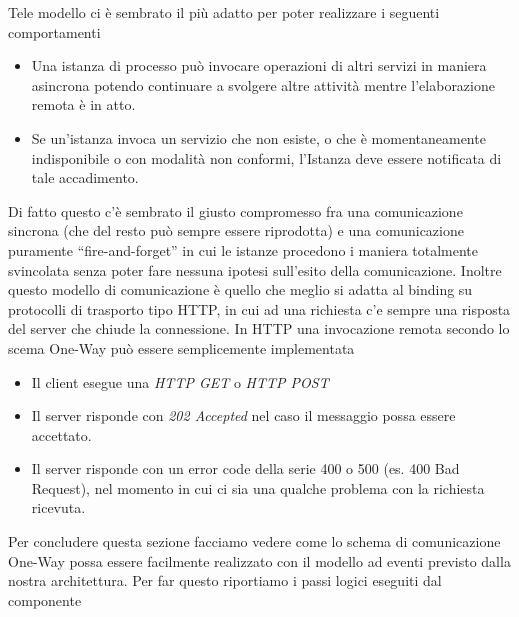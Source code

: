 Tele modello ci \`e sembrato il più adatto per poter realizzare i seguenti
comportamenti

\begin{itemize}
  \item Una istanza di processo può invocare operazioni di altri servizi in
  maniera asincrona potendo continuare a svolgere altre attività mentre
  l'elaborazione remota \`e in atto.
  
  \item Se un'istanza invoca un servizio che non esiste, o che \`e
  momentaneamente indisponibile o con modalità non conformi, l'Istanza deve essere notificata
  di tale accadimento.
\end{itemize}

Di fatto questo c'\`e sembrato il giusto compromesso fra una comunicazione
sincrona (che del resto può sempre essere riprodotta) e una comunicazione puramente
``fire-and-forget'' in cui le istanze procedono i maniera totalmente svincolata
senza poter fare nessuna ipotesi sull'esito della comunicazione. Inoltre questo
modello di comunicazione \`e quello che meglio si adatta al binding su
protocolli di trasporto tipo HTTP, in cui ad una richiesta c'e sempre una
risposta del server che chiude la connessione. In HTTP una invocazione remota secondo lo scema
One-Way può essere semplicemente implementata

\begin{itemize}
  \item Il client esegue una \emph{HTTP GET} o \emph{HTTP POST}
  \item Il server risponde con \emph{202 Accepted} nel caso il messaggio possa
  essere accettato.
  \item Il server risponde con un error code della serie 400 o 500 (es. 400 Bad
  Request), nel momento in cui ci sia una qualche problema con la richiesta
  ricevuta.
\end{itemize}


Per concludere questa sezione facciamo vedere come lo schema di comunicazione
One-Way possa essere facilmente realizzato con il modello ad eventi previsto
dalla nostra architettura. Per far questo riportiamo i passi logici eseguiti
dal componente 

